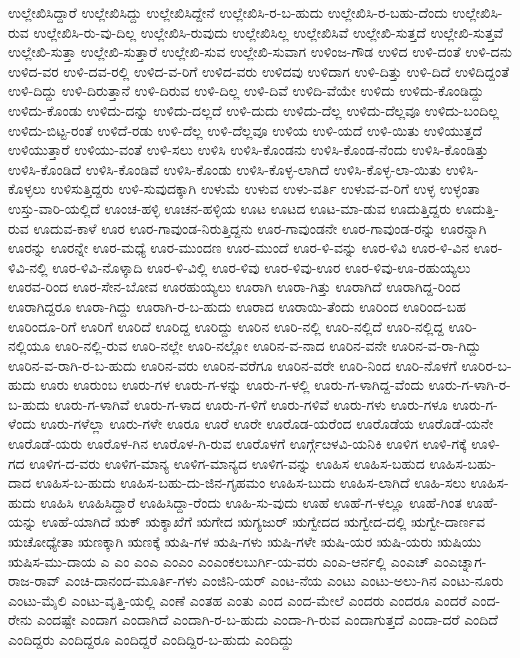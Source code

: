 ಉಲ್ಲೇಖಿಸಿದ್ದಾರೆ
ಉಲ್ಲೇಖಿಸಿದ್ದು
ಉಲ್ಲೇಖಿಸಿದ್ದೇನೆ
ಉಲ್ಲೇಖಿಸಿ-ರ-ಬ-ಹುದು
ಉಲ್ಲೇಖಿಸಿ-ರ-ಬಹು-ದೆಂದು
ಉಲ್ಲೇಖಿಸಿ-ರುವ
ಉಲ್ಲೇಖಿಸಿ-ರು-ವು-ದಿಲ್ಲ
ಉಲ್ಲೇಖಿಸಿ-ರುವುದು
ಉಲ್ಲೇಖಿಸಿಲ್ಲ
ಉಲ್ಲೇಖಿಸಿವೆ
ಉಲ್ಲೇಖಿ-ಸುತ್ತದೆ
ಉಲ್ಲೇಖಿ-ಸುತ್ತವೆ
ಉಲ್ಲೇಖಿ-ಸುತ್ತಾ
ಉಲ್ಲೇಖಿ-ಸುತ್ತಾರೆ
ಉಲ್ಲೇಖಿ-ಸುವ
ಉಲ್ಲೇಖಿ-ಸುವಾಗ
ಉಳಿಂಜ-ಗೌಡ
ಉಳಿದ
ಉಳಿ-ದಂತೆ
ಉಳಿ-ದನು
ಉಳಿದ-ವರ
ಉಳಿ-ದವ-ರಲ್ಲಿ
ಉಳಿದ-ವ-ರಿಗೆ
ಉಳಿದ-ವರು
ಉಳಿದವು
ಉಳಿದಾಗ
ಉಳಿ-ದಿತ್ತು
ಉಳಿ-ದಿದೆ
ಉಳಿದಿದ್ದಂತೆ
ಉಳಿ-ದಿದ್ದು
ಉಳಿ-ದಿರುತ್ತಾನೆ
ಉಳಿ-ದಿರುವ
ಉಳಿ-ದಿಲ್ಲ
ಉಳಿ-ದಿವೆ
ಉಳಿದಿ-ವೆಯೇ
ಉಳಿದು
ಉಳಿದು-ಕೊಂಡಿದ್ದು
ಉಳಿದು-ಕೊಂಡು
ಉಳಿದು-ದನ್ನು
ಉಳಿದು-ದಲ್ಲದೆ
ಉಳಿ-ದುದು
ಉಳಿದು-ದೆಲ್ಲ
ಉಳಿದು-ದೆಲ್ಲವೂ
ಉಳಿದು-ಬಂದಿಲ್ಲ
ಉಳಿದು-ಬಿಟ್ಟ-ರಂತೆ
ಉಳಿದೆ-ರಡು
ಉಳಿ-ದೆಲ್ಲ
ಉಳಿ-ದೆಲ್ಲವೂ
ಉಳಿಯ
ಉಳಿ-ಯದೆ
ಉಳಿ-ಯಿತು
ಉಳಿಯುತ್ತದೆ
ಉಳಿಯುತ್ತಾರೆ
ಉಳಿಯು-ವಂತೆ
ಉಳಿ-ಸಲು
ಉಳಿಸಿ
ಉಳಿಸಿ-ಕೊಂಡನು
ಉಳಿಸಿ-ಕೊಂಡ-ನೆಂದು
ಉಳಿಸಿ-ಕೊಂಡಿತ್ತು
ಉಳಿಸಿ-ಕೊಂಡಿದೆ
ಉಳಿಸಿ-ಕೊಂಡಿವೆ
ಉಳಿಸಿ-ಕೊಂಡು
ಉಳಿಸಿ-ಕೊಳ್ಳ-ಲಾಗಿದೆ
ಉಳಿಸಿ-ಕೊಳ್ಳ-ಲಾ-ಯಿತು
ಉಳಿಸಿ-ಕೊಳ್ಳಲು
ಉಳಿಸುತ್ತಿದ್ದರು
ಉಳಿ-ಸುವುದಕ್ಕಾಗಿ
ಉಳುಮೆ
ಉಳುವ
ಉಳು-ವರ್ತಿ
ಉಳುವ-ವ-ರಿಗೆ
ಉಳ್ಳ
ಉಳ್ಳಂತಾ
ಉಸ್ತು-ವಾರಿ-ಯಲ್ಲಿದೆ
ಊಂಚ-ಹಳ್ಳಿ
ಊಚನ-ಹಳ್ಳಿಯ
ಊಟ
ಊಟದ
ಊಟ-ಮಾ-ಡುವ
ಊದುತ್ತಿದ್ದರು
ಊದುತ್ತಿ-ರುವ
ಊದುವ-ಕಾಳೆ
ಊರ
ಊರ-ಗಾವುಂಡ-ನಿರುತ್ತಿದ್ದನು
ಊರ-ಗಾವುಂಡನೇ
ಊರ-ಗಾವುಂಡ-ರನ್ನು
ಊರನ್ನಾಗಿ
ಊರನ್ನು
ಊರನ್ನೇ
ಊರ-ಮಧ್ಯೆ
ಊರ-ಮುಂದಣ
ಊರ-ಮುಂದೆ
ಊರ-ಳಿ-ವನ್ನು
ಊರ-ಳಿವಿ
ಊರ-ಳಿ-ವಿನ
ಊರ-ಳಿವಿ-ನಲ್ಲಿ
ಊರ-ಳಿವಿ-ನೊಳ್ಕಾದಿ
ಊರ-ಳಿ-ವಿಲ್ಲಿ
ಊರ-ಳಿವು
ಊರ-ಳಿವು-ಊರ
ಊರ-ಳಿವು-ಊ-ರಹುಯ್ಯಲು
ಊರವ-ರಿಂದ
ಊರ-ಸೇನ-ಬೋವ
ಊರಹುಯ್ಯಲು
ಊರಾಗಿ
ಊರಾ-ಗಿತ್ತು
ಊರಾಗಿದೆ
ಊರಾಗಿದ್ದ-ರಿಂದ
ಊರಾಗಿದ್ದರೂ
ಊರಾ-ಗಿದ್ದು
ಊರಾಗಿ-ರ-ಬ-ಹುದು
ಊರಾದ
ಊರಾಯಿ-ತೆಂದು
ಊರಿಂದ
ಊರಿಂದ-ಬಹ
ಊರಿಂದೂ-ರಿಗೆ
ಊರಿಗೆ
ಊರಿದೆ
ಊರಿದ್ದ
ಊರಿದ್ದು
ಊರಿನ
ಊರಿ-ನಲ್ಲಿ
ಊರಿ-ನಲ್ಲಿದೆ
ಊರಿ-ನಲ್ಲಿದ್ದ
ಊರಿ-ನಲ್ಲಿಯೂ
ಊರಿ-ನಲ್ಲಿ-ರುವ
ಊರಿ-ನಲ್ಲೇ
ಊರಿ-ನಲ್ಲೋ
ಊರಿನ-ವ-ನಾದ
ಊರಿನ-ವನೇ
ಊರಿನ-ವ-ರಾ-ಗಿದ್ದು
ಊರಿನ-ವ-ರಾಗಿ-ರ-ಬ-ಹುದು
ಊರಿನ-ವರು
ಊರಿನ-ವರೆಗೂ
ಊರಿನ-ವರೇ
ಊರಿ-ನಿಂದ
ಊರಿ-ನೊಳಗೆ
ಊರಿರ-ಬ-ಹುದು
ಊರು
ಊರುಂಬ
ಊರು-ಗಳ
ಊರು-ಗ-ಳನ್ನು
ಊರು-ಗ-ಳಲ್ಲಿ
ಊರು-ಗ-ಳಾಗಿದ್ದ-ವೆಂದು
ಊರು-ಗ-ಳಾಗಿ-ರ-ಬ-ಹುದು
ಊರು-ಗ-ಳಾಗಿವೆ
ಊರು-ಗ-ಳಾದ
ಊರು-ಗ-ಳಿಗೆ
ಊರು-ಗಳಿವೆ
ಊರು-ಗಳು
ಊರು-ಗಳೂ
ಊರು-ಗ-ಳೆಂದು
ಊರು-ಗಳೆಲ್ಲಾ
ಊರು-ಗಳೇ
ಊರೂ
ಊರೆ
ಊರೇ
ಊರೊಡ-ಯರೆಂದ
ಊರೊಡೆಯ
ಊರೊಡೆ-ಯನೇ
ಊರೊಡೆ-ಯರು
ಊರೊಳ-ಗಿನ
ಊರೊಳ-ಗಿ-ರುವ
ಊರೊಳಗೆ
ಊರ್ಗ್ಗೆೞಳವಿ-ಯನಿಕಿ
ಊಳಿಗ
ಊಳಿ-ಗಕ್ಕೆ
ಊಳಿ-ಗದ
ಊಳಿಗ-ದ-ವರು
ಊಳಿಗ-ಮಾನ್ಯ
ಊಳಿಗ-ಮಾನ್ಯದ
ಊಳಿಗ-ವನ್ನು
ಊಹಿಸ
ಊಹಿಸ-ಬಹುದ
ಊಹಿಸ-ಬಹು-ದಾದ
ಊಹಿಸ-ಬ-ಹುದು
ಊಹಿಸ-ಬಹು-ದು-ಜಿನ-ಗೃಹಮಂ
ಊಹಿಸ-ಬುದು
ಊಹಿಸ-ಲಾಗಿದೆ
ಊಹಿ-ಸಲು
ಊಹಿಸ-ಹುದು
ಊಹಿಸಿ
ಊಹಿಸಿದ್ದಾರೆ
ಊಹಿಸಿದ್ದಾ-ರೆಂದು
ಊಹಿ-ಸು-ವುದು
ಊಹೆ
ಊಹೆ-ಗ-ಳಲ್ಲೂ
ಊಹೆ-ಗಿಂತ
ಊಹೆ-ಯನ್ನು
ಊಹೆ-ಯಾಗಿದೆ
ಋಕ್
ಋಕ್ಶಾಖೆಗೆ
ಋಗೇದ
ಋಗ್ಯಜುರ್
ಋಗ್ವೇದದ
ಋಗ್ವೇದ-ದಲ್ಲಿ
ಋಗ್ವೇ-ದಾರ್ಣವ
ಋಚೋಧ್ಯೇತಾ
ಋಣಕ್ಕಾಗಿ
ಋಣಕ್ಕೆ
ಋಷಿ-ಗಳ
ಋಷಿ-ಗಳು
ಋಷಿ-ಗಳೇ
ಋಷಿ-ಯರ
ಋಷಿ-ಯರು
ಋಷಿಯು
ಋಷಿಸ-ಮು-ದಾಯ
ಎ
ಎಂ
ಎಂಎ
ಎಂಎಂ
ಎಂಎಂಕಲಬುರ್ಗಿ-ಯ-ವರು
ಎಂಎ-ಆರ್ನಲ್ಲಿ
ಎಂಎಚ್
ಎಂಎಚ್ನಾಗ-ರಾಜ-ರಾವ್
ಎಂಚಿ-ದಾನಂದ-ಮೂರ್ತಿ-ಗಳು
ಎಂಜಿನಿ-ಯರ್
ಎಂಟ-ನೆಯ
ಎಂಟು
ಎಂಟು-ಅಲು-ಗಿನ
ಎಂಟು-ನೂರು
ಎಂಟು-ಮೈಲಿ
ಎಂಟು-ವೃತ್ತಿ-ಯಲ್ಲಿ
ಎಂಣೆ
ಎಂತಹ
ಎಂತು
ಎಂದ
ಎಂದ-ಮೇಲೆ
ಎಂದರು
ಎಂದರೂ
ಎಂದರೆ
ಎಂದ-ರೇನು
ಎಂದಷ್ಟೇ
ಎಂದಾಗ
ಎಂದಾಗಿದೆ
ಎಂದಾಗಿ-ರ-ಬ-ಹುದು
ಎಂದಾ-ಗಿ-ರುವ
ಎಂದಾಗುತ್ತದೆ
ಎಂದಾ-ದರೆ
ಎಂದಿದೆ
ಎಂದಿದ್ದರು
ಎಂದಿದ್ದರೂ
ಎಂದಿದ್ದರೆ
ಎಂದಿದ್ದಿರ-ಬ-ಹುದು
ಎಂದಿದ್ದು

